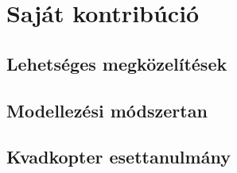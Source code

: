 \chapter{Saját kontribúció}

\section{Lehetséges megközelítések}

\section{Modellezési módszertan}

\section{Kvadkopter esettanulmány}